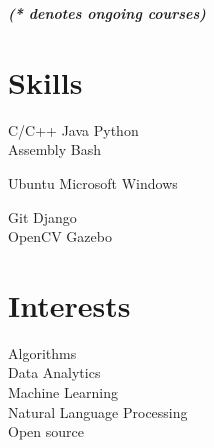 \documentclass[a4paper]{deedy-resume} %
\begin{document}
\begin{minipage}[t]{0.33\textwidth}
  {\footnotesize \textit{\textbf{(* denotes ongoing courses) }}} \\

  \sectionspace

  \section{Skills}

  \runsubsection{}
  C/C++ \textbullet{} Java \textbullet{} Python \\
  \textbullet{} Assembly \textbullet{} Bash

  \sectionspace
  \sectionspace

  Ubuntu \textbullet{} Microsoft Windows

  \sectionspace
  \sectionspace

  Git \textbullet{} Django  \\
  \textbullet{} OpenCV \textbullet{} Gazebo

  \sectionspace
  \sectionspace

  \section{Interests}
  Algorithms \\
  Data Analytics \\
  Machine Learning \\
  Natural Language Processing \\
  Open source \\
\end{minipage}
\hfill
\end{document}
